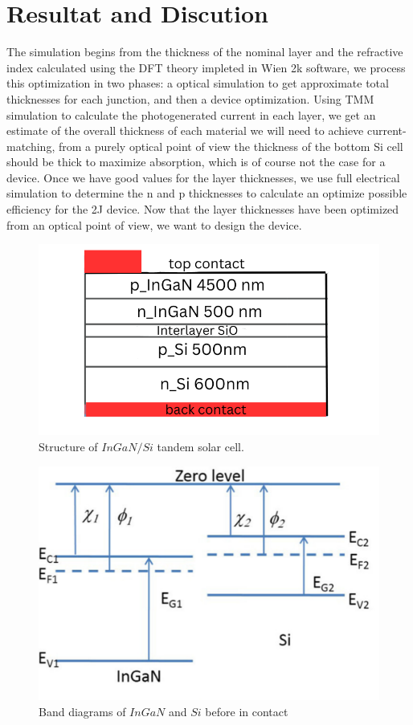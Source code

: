 \documentclass[preprint,12pt]{elsarticle}
\begin{document}
\section{Resultat and Discution} \label{sec:Resultat and Discution}
The simulation begins from the thickness of the nominal layer and the refractive index calculated using the DFT theory impleted in Wien 2k software, we process this optimization in two phases: a optical simulation to get approximate total thicknesses for each junction, and then a device optimization. Using TMM simulation to calculate the photogenerated current in each layer, we get an estimate of the overall thickness of each material we will need to achieve current-matching, from a purely optical point of view the thickness of the bottom Si cell should be thick to maximize absorption, which is of course not the case for a device. Once we have good values for the layer thicknesses, we use full electrical simulation to determine the n and p thicknesses to calculate an optimize possible efficiency for the 2J device. Now that the layer thicknesses have been optimized from an optical point of view, we want to design the device.

\begin{figure}[h!]
	\centering
	\includegraphics[width=0.7\linewidth]{Figure/structure}
	\caption{Structure of $InGaN/Si$ tandem solar cell.}
	\label{fig:structure}
\end{figure}


\begin{figure}[h!]
	\centering
	\includegraphics[width=0.7\linewidth, height=0.3\textheight]{Figure/InGaN_Si}
	\caption{Band diagrams of $InGaN$ and $Si$ before in contact}
	\label{fig:ingansi}
\end{figure}
\end{document}
